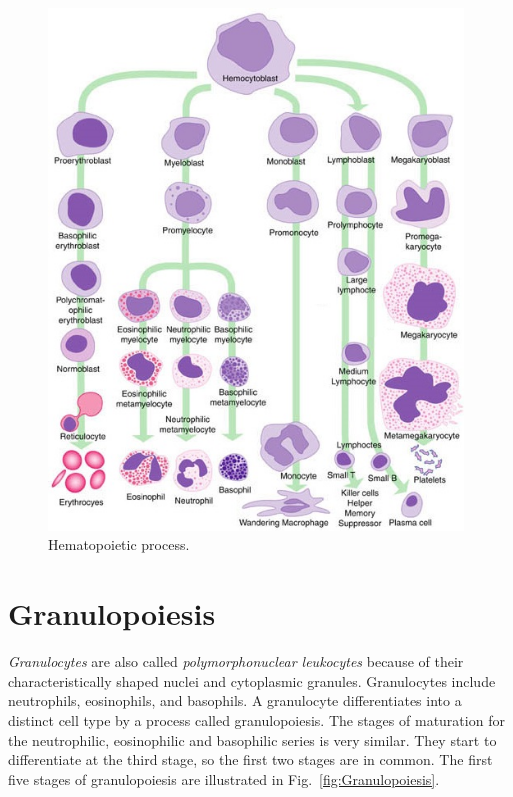 \documentclass[final,a4paper,12pt,english]{UnicaPhdThesis3}
\begin{document}
{\begin{figure}[!htbp]
\centering
\includegraphics[width=0.98\textwidth]{images/Hematopoiesis}
\caption{\label{fig:Haematopoiesis} Hematopoietic process.}
\end{figure}

\section{Granulopoiesis}
\textit{Granulocytes} are also called \textit{polymorphonuclear leukocytes} because of their characteristically shaped nuclei and cytoplasmic granules. Granulocytes include neutrophils, eosinophils, and basophils. A granulocyte differentiates into a distinct cell type by a process called granulopoiesis. The stages of maturation for the neutrophilic, eosinophilic and basophilic series is very similar. They start to differentiate at the third stage, so the first two stages are in common. The first five stages of granulopoiesis are illustrated in Fig.~\ref{fig:Granulopoiesis}.
 
}
\end{document}
